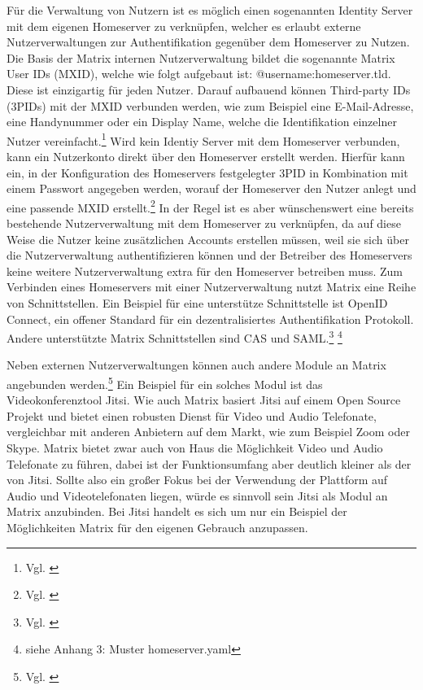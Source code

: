 Für die Verwaltung von Nutzern ist es möglich einen sogenannten Identity Server mit dem eigenen Homeserver zu verknüpfen, welcher es erlaubt externe Nutzerverwaltungen zur Authentifikation gegenüber dem Homeserver zu Nutzen. Die Basis der Matrix internen Nutzerverwaltung bildet die sogenannte Matrix User IDs (MXID), welche wie folgt aufgebaut ist: \glqq @username:homeserver.tld\grqq{}. Diese ist einzigartig für jeden Nutzer. Darauf aufbauend können Third-party IDs (3PIDs) mit der MXID verbunden werden, wie zum Beispiel eine E-Mail-Adresse, eine Handynummer oder ein Display Name, welche die Identifikation einzelner Nutzer vereinfacht.\footnote{Vgl. \cite{Matirx.org-specifications2020}}
Wird kein Identiy Server mit dem Homeserver verbunden, kann ein Nutzerkonto direkt über den Homeserver erstellt werden. Hierfür kann ein, in der Konfiguration des Homeservers festgelegter 3PID in Kombination mit einem Passwort angegeben werden, worauf der Homeserver den Nutzer anlegt und eine passende MXID erstellt.\footnote{Vgl. \cite{Matirx.org-specifications2020}}
In der Regel ist es aber wünschenswert eine bereits bestehende Nutzerverwaltung mit dem Homeserver zu verknüpfen, da auf diese Weise die Nutzer keine zusätzlichen Accounts erstellen müssen, weil sie sich über die Nutzerverwaltung authentifizieren können und der Betreiber des Homeservers keine weitere Nutzerverwaltung extra für den Homeserver betreiben muss. Zum Verbinden eines Homeservers mit einer Nutzerverwaltung nutzt Matrix eine Reihe von Schnittstellen. Ein Beispiel für eine unterstütze Schnittstelle ist OpenID Connect, ein offener Standard für ein dezentralisiertes Authentifikation Protokoll. Andere unterstützte Matrix Schnittstellen sind CAS und SAML.\footnote{Vgl. \cite{Matirx.org-specifications2020}} \footnote{siehe Anhang 3: Muster homeserver.yaml} 

Neben externen Nutzerverwaltungen können auch andere Module an Matrix angebunden werden.\footnote{Vgl. \cite{Matirx.org-specifications2020}} Ein Beispiel für ein solches Modul ist das Videokonferenztool Jitsi. Wie auch Matrix basiert Jitsi auf einem Open Source Projekt und bietet einen robusten Dienst für Video und Audio Telefonate, vergleichbar mit anderen Anbietern auf dem Markt, wie zum Beispiel Zoom oder Skype. Matrix bietet zwar auch von Haus die Möglichkeit Video und Audio Telefonate zu führen, dabei ist der Funktionsumfang aber deutlich kleiner als der von Jitsi. Sollte also ein großer Fokus bei der Verwendung der Plattform auf Audio und Videotelefonaten liegen, würde es sinnvoll sein Jitsi als Modul an Matrix anzubinden. Bei Jitsi handelt es sich um nur ein Beispiel der Möglichkeiten Matrix für den eigenen Gebrauch anzupassen. 

